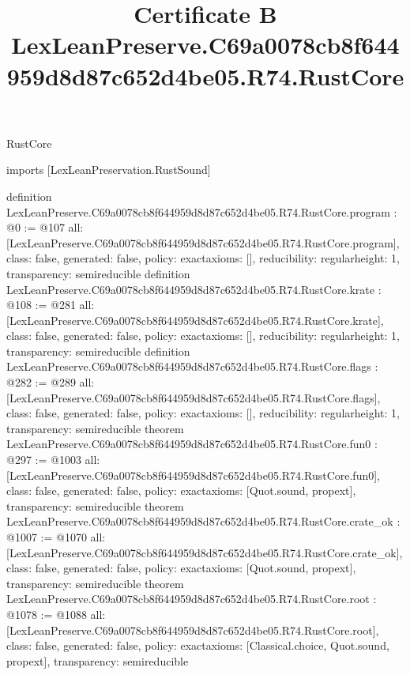 \begin{lexlean}{RustCore}
\title{Certificate B LexLeanPreserve.C69a0078cb8f644959d8d87c652d4be05.R74.RustCore}
\begin{coremodule}
imports [LexLeanPreservation.RustSound]

definition LexLeanPreserve.C69a0078cb8f644959d8d87c652d4be05.R74.RustCore.program : @0 := @107 {
  all: [LexLeanPreserve.C69a0078cb8f644959d8d87c652d4be05.R74.RustCore.program],
  class: false,
  generated: false,
  policy: exact{axioms: []},
  reducibility: regular{height: 1},
  transparency: semireducible
}
definition LexLeanPreserve.C69a0078cb8f644959d8d87c652d4be05.R74.RustCore.krate : @108 := @281 {
  all: [LexLeanPreserve.C69a0078cb8f644959d8d87c652d4be05.R74.RustCore.krate],
  class: false,
  generated: false,
  policy: exact{axioms: []},
  reducibility: regular{height: 1},
  transparency: semireducible
}
definition LexLeanPreserve.C69a0078cb8f644959d8d87c652d4be05.R74.RustCore.flags : @282 := @289 {
  all: [LexLeanPreserve.C69a0078cb8f644959d8d87c652d4be05.R74.RustCore.flags],
  class: false,
  generated: false,
  policy: exact{axioms: []},
  reducibility: regular{height: 1},
  transparency: semireducible
}
theorem LexLeanPreserve.C69a0078cb8f644959d8d87c652d4be05.R74.RustCore.fun0 : @297 := @1003 {
  all: [LexLeanPreserve.C69a0078cb8f644959d8d87c652d4be05.R74.RustCore.fun0],
  class: false,
  generated: false,
  policy: exact{axioms: [Quot.sound, propext]},
  transparency: semireducible
}
theorem LexLeanPreserve.C69a0078cb8f644959d8d87c652d4be05.R74.RustCore.crate_ok : @1007 := @1070 {
  all: [LexLeanPreserve.C69a0078cb8f644959d8d87c652d4be05.R74.RustCore.crate_ok],
  class: false,
  generated: false,
  policy: exact{axioms: [Quot.sound, propext]},
  transparency: semireducible
}
theorem LexLeanPreserve.C69a0078cb8f644959d8d87c652d4be05.R74.RustCore.root : @1078 := @1088 {
  all: [LexLeanPreserve.C69a0078cb8f644959d8d87c652d4be05.R74.RustCore.root],
  class: false,
  generated: false,
  policy: exact{axioms: [Classical.choice, Quot.sound, propext]},
  transparency: semireducible
}


\end{coremodule}
\end{lexlean}
